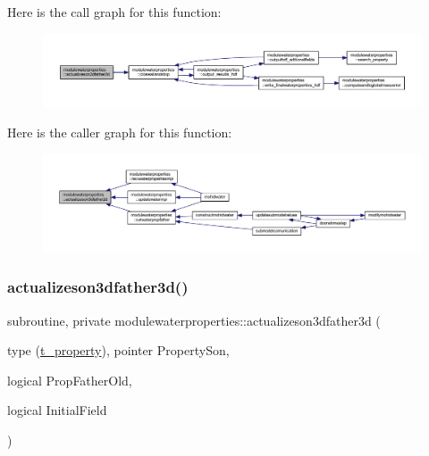 Here is the call graph for this function\+:\nopagebreak
\begin{figure}[H]
\begin{center}
\leavevmode
\includegraphics[width=350pt]{namespacemodulewaterproperties_ab0b8edf280ffb8e69ae400f400b252c9_cgraph}
\end{center}
\end{figure}
Here is the caller graph for this function\+:\nopagebreak
\begin{figure}[H]
\begin{center}
\leavevmode
\includegraphics[width=350pt]{namespacemodulewaterproperties_ab0b8edf280ffb8e69ae400f400b252c9_icgraph}
\end{center}
\end{figure}
\mbox{\label{namespacemodulewaterproperties_a300389c60d61f49a71a655925f38baab}} 
\subsubsection{\texorpdfstring{actualizeson3dfather3d()}{actualizeson3dfather3d()}}
{\footnotesize\ttfamily subroutine, private modulewaterproperties\+::actualizeson3dfather3d (\begin{DoxyParamCaption}\item[{type (\mbox{\hyperlink{structmodulewaterproperties_1_1t__property}{t\+\_\+property}}), pointer}]{Property\+Son,  }\item[{logical}]{Prop\+Father\+Old,  }\item[{logical}]{Initial\+Field }\end{DoxyParamCaption})\hspace{0.3cm}{\ttfamily [private]}}

